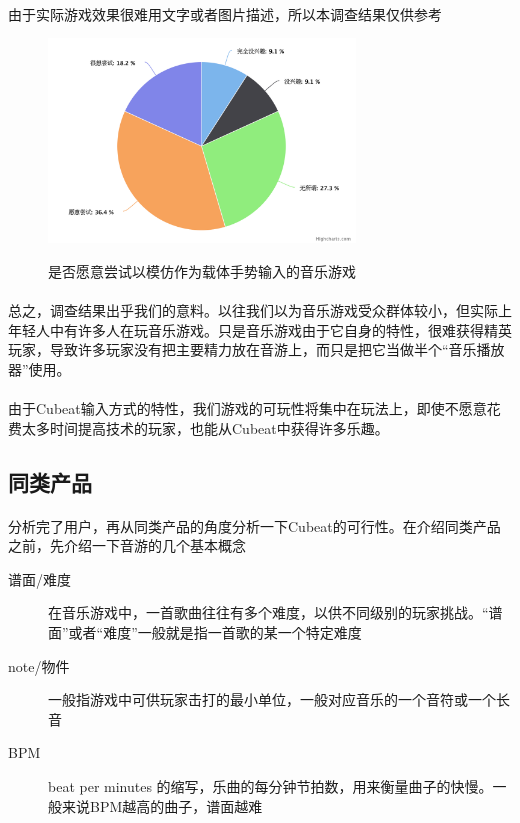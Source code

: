 \documentclass{article}
\begin{document}
\paragraph{}
由于实际游戏效果很难用文字或者图片描述，所以本调查结果仅供参考
\begin{figure}[H]
  \centering
  \includegraphics[width=22em]{chart5.png}\\
  \caption{是否愿意尝试以模仿作为载体手势输入的音乐游戏}\label{2-5}
\end{figure}
\paragraph{}
总之，调查结果出乎我们的意料。以往我们以为音乐游戏受众群体较小，但实际上年轻人中有许多人在玩音乐游戏。只是音乐游戏由于它自身的特性，很难获得精英玩家，导致许多玩家没有把主要精力放在音游上，而只是把它当做半个“音乐播放器”使用。
\paragraph{}
由于Cubeat输入方式的特性，我们游戏的可玩性将集中在玩法上，即使不愿意花费太多时间提高技术的玩家，也能从Cubeat中获得许多乐趣。
\subsection{同类产品}
\paragraph{}
分析完了用户，再从同类产品的角度分析一下Cubeat的可行性。在介绍同类产品之前，先介绍一下音游的几个基本概念
\begin{description}
  \item[谱面/难度] 在音乐游戏中，一首歌曲往往有多个难度，以供不同级别的玩家挑战。“谱面”或者“难度”一般就是指一首歌的某一个特定难度
  \item[note/物件] 一般指游戏中可供玩家击打的最小单位，一般对应音乐的一个音符或一个长音
  \item[BPM] beat per minutes 的缩写，乐曲的每分钟节拍数，用来衡量曲子的快慢。一般来说BPM越高的曲子，谱面越难
\end{description}
\end{document}
